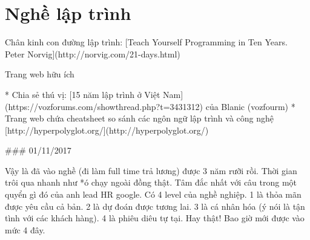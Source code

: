 \chapter{Nghề lập trình}

Chân kinh con đường lập trình: [Teach Yourself Programming in Ten Years. Peter Norvig](http://norvig.com/21-days.html)

Trang web hữu ích

* Chia sẻ thú vị: [15 năm lập trình ở Việt Nam](https://vozforums.com/showthread.php?t=3431312) của Blanic (vozfourm)
* Trang web chứa cheatsheet so sánh các ngôn ngữ lập trình và công nghệ [http://hyperpolyglot.org/](http://hyperpolyglot.org/)

### 01/11/2017

Vậy là đã vào nghề (đi làm full time trả lương) được 3 năm rưỡi rồi. Thời gian trôi qua nhanh như *ó chạy ngoài đồng thật. Tâm đắc nhất với câu trong một quyển gì đó của anh lead HR google. Có 4 level của nghề nghiệp. 1 là thỏa mãn được yêu cầu cả bản. 2 là dự đoán được tương lai. 3 là cá nhân hóa (ý nói là tận tình với các khách hàng). 4 là phiêu diêu tự tại. Hay thật! Bao giờ mới được vào mức 4 đây.